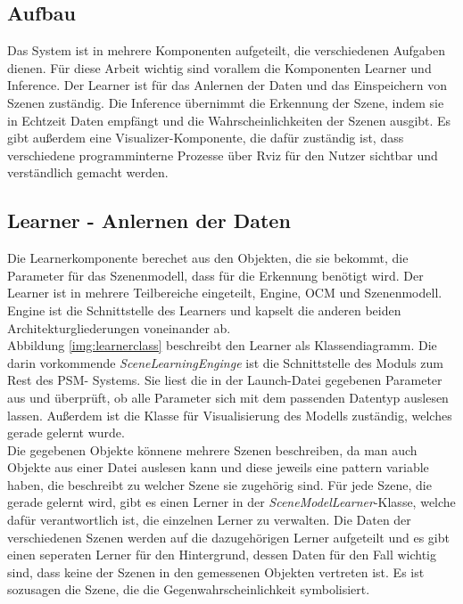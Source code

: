 \subsection{Aufbau}
Das System ist in mehrere Komponenten aufgeteilt, die verschiedenen Aufgaben dienen. Für diese Arbeit wichtig sind vorallem die Komponenten Learner und Inference. Der Learner ist für das Anlernen der Daten und das Einspeichern von Szenen zuständig. Die Inference übernimmt die Erkennung der Szene, indem sie in Echtzeit Daten empfängt und die Wahrscheinlichkeiten der Szenen ausgibt. Es gibt außerdem eine Visualizer-Komponente, die dafür zuständig ist, dass verschiedene programminterne Prozesse über Rviz für den Nutzer sichtbar und verständlich gemacht werden.\cite{sibo96}
\subsection{Learner - Anlernen der Daten}
Die Learnerkomponente berechet aus den Objekten, die sie bekommt, die Parameter für das Szenenmodell, dass für die Erkennung benötigt wird. Der Learner ist in mehrere Teilbereiche eingeteilt, Engine, OCM und Szenenmodell. Engine ist die Schnittstelle des Learners und kapselt die anderen beiden Architekturgliederungen voneinander ab.\smallskip\\
Abbildung \ref{img:learnerclass} beschreibt den Learner als Klassendiagramm. Die darin vorkommende \textit{SceneLearningEnginge} ist die Schnittstelle des Moduls zum Rest des PSM- Systems. Sie liest die in der Launch-Datei gegebenen Parameter aus und überprüft, ob alle Parameter sich mit dem passenden Datentyp auslesen lassen. Außerdem ist die Klasse für Visualisierung des Modells zuständig, welches gerade gelernt wurde. \smallskip\\
Die gegebenen Objekte könnene mehrere Szenen beschreiben, da man auch Objekte aus einer Datei auslesen kann und diese jeweils eine pattern variable haben, die beschreibt zu welcher Szene sie zugehörig sind. Für jede Szene, die gerade gelernt wird, gibt es einen Lerner in der \textit{SceneModelLearner}-Klasse, welche dafür verantwortlich ist, die einzelnen Lerner zu verwalten. Die Daten der verschiedenen Szenen werden auf die dazugehörigen Lerner aufgeteilt und es gibt einen seperaten Lerner für den Hintergrund, dessen Daten für den Fall wichtig sind, dass keine der Szenen in den gemessenen Objekten vertreten ist. Es ist sozusagen die Szene, die die Gegenwahrscheinlichkeit symbolisiert.\cite{kuinin94}\smallskip\\

